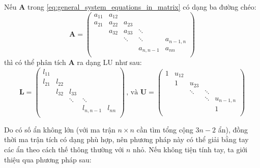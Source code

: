 \documentclass[../../Lectures]{subfiles}
\begin{document}
Nếu \(\bm{A}\) trong \eqref{eq:general_system_equations_in_matrix} có dạng ba
đường chéo:
\[
    \bm{A} =
        \begin{pmatrix}
            a_{11}  &  a_{12}  &          &                &                \\
            a_{21}  &  a_{22}  &  a_{23}  &                &                \\
                    &  a_{32}  &  a_{33}  &     \ddots     &                \\
                    &          &  \ddots  &     \ddots     &  a_{n - 1, n}  \\
                    &          &          &  a_{n, n - 1}  &     a_{nn}     \\
        \end{pmatrix}
\]
thì có thể phân tích \(\bm{A}\) ra dạng LU như sau:
\[
    \bm{L} =
        \begin{pmatrix}
            l_{11}  &          &          &                &          \\
            l_{21}  &  l_{22}  &          &                &          \\
                    &  l_{32}  &  l_{33}  &                &          \\
                    &          &  \ddots  &     \ddots     &          \\
                    &          &          &  l_{n, n - 1}  &  l_{nn}  \\
        \end{pmatrix}
    \, \text{, và }
    \bm{U} =
        \begin{pmatrix}
            1  &  u_{12}  &          &          &                \\
               &    1     &  u_{23}  &          &                \\
               &          &  \ddots  &  \ddots  &                \\
               &          &          &  \ddots  &  u_{n - 1, n}  \\
               &          &          &          &     1          \\

        \end{pmatrix}
\]

Do có số ẩn không lớn (với ma trận \(n \times n\) cần tìm tổng cộng \(3n - 2\)
ẩn), đồng thời ma trận tích có dạng phù hợp, nên phương pháp này có thể giải
bằng tay các ẩn theo cách thế thông thường với \(n\) nhỏ. Nếu không tiện tính
tay, ta giới thiệu qua phương pháp sau:
\end{document}
